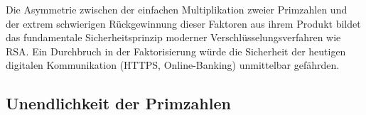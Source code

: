 \begin{didactic-insight}
Die Asymmetrie zwischen der einfachen Multiplikation zweier Primzahlen und der extrem schwierigen Rückgewinnung dieser Faktoren aus ihrem Produkt bildet das fundamentale Sicherheitsprinzip moderner Verschlüsselungsverfahren wie RSA. Ein Durchbruch in der Faktorisierung würde die Sicherheit der heutigen digitalen Kommunikation (HTTPS, Online-Banking) unmittelbar gefährden.
\end{didactic-insight}

\subsection{Unendlichkeit der Primzahlen}

\begin{math-stroke}
\end{math-stroke}

